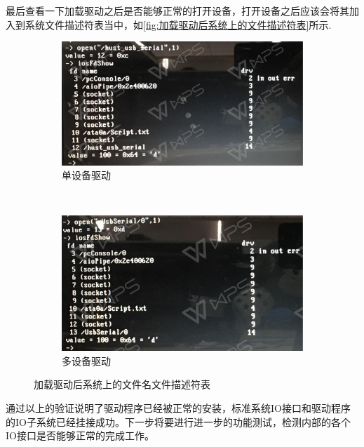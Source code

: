 \noindent 最后查看一下加载驱动之后是否能够正常的打开设备，打开设备之后应该会将其加入到系统文件描述符表当中，如\autoref{fig:加载驱动后系统上的文件描述符表}所示.
\begin{figure}[h]
\centering
  \begin{subfigure}[b]{0.4\textwidth}
  \includegraphics[width=\textwidth]{./graphics/iosFdShowS.pdf}
  \caption{单设备驱动}
  \end{subfigure}
  ~
  \begin{subfigure}[b]{0.4\textwidth}
  \includegraphics[width=\textwidth]{./graphics/iosFdShowM.pdf}
  \caption{多设备驱动}
  \end{subfigure}
\caption{加载驱动后系统上的文件名文件描述符表}\label{fig:加载驱动后系统上的文件描述符表}
\end{figure}

通过以上的验证说明了驱动程序已经被正常的安装，标准系统IO接口和驱动程序的IO子系统已经挂接成功。下一步将要进行进一步的功能测试，检测内部的各个IO接口是否能够正常的完成工作。
	
